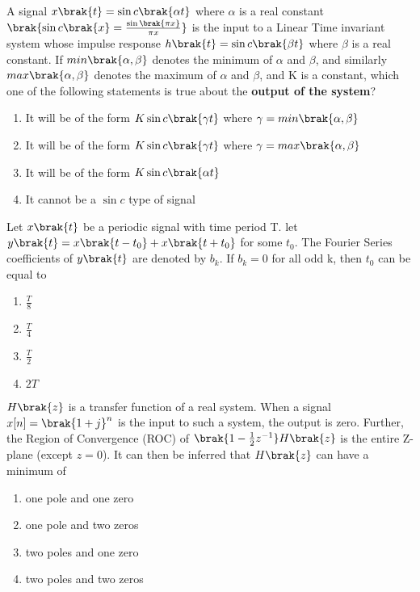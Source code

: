       \item A signal $x\brak{t}=\sin c\brak{\alpha t}$ where $\alpha$ is a real constant $\brak{\sin c\brak{x}=\frac{\sin\brak{\pi x}}{\pi x}}$ is the input to a Linear Time invariant system whose impulse response $h\brak{t}=\sin c\brak{\beta t}$ where $\beta$ is a real constant. If $min\brak{\alpha,\beta}$ denotes the minimum of $\alpha$ and $\beta$, and similarly $max\brak{\alpha,\beta}$ denotes the maximum of $\alpha$ and $\beta$, and K is a constant, which one of the following statements is true about the \textbf{output of the system}?
      \begin{enumerate}
          \item It will be of the form $K\sin c\brak{\gamma t}$ where $\gamma=min\brak{\alpha,\beta}$
           \item It will be of the form $K\sin c\brak{\gamma t}$ where $\gamma=max\brak{\alpha,\beta}$
           \item It will be of the form $K \sin c\brak{\alpha t}$
           \item It cannot be a $\sin c$ type of signal
      \end{enumerate}
      \item Let $x\brak{t}$ be  a periodic signal with time period T. let $y\brak{t}=x\brak{t-t_0}+x\brak{t+t_0}$ for some $t_0$. The Fourier Series coefficients of $y\brak{t}$ are denoted by $b_k$. If $b_k=0$ for all odd k, then $t_0$ can be equal to 
      \begin{enumerate}
          \item $\frac{T}{8}$
          \item $\frac{T}{4}$
          \item $\frac{T}{2}$
          \item $2T$
      \end{enumerate}
      \item $H\brak{z}$ is a transfer function of a real system. When a signal $x[n]=\brak{1+j}^n$ is the input to such a system, the output is zero. Further, the Region of Convergence (ROC) of $\brak{1-\frac{1}{2}z^{-1}}H\brak{z}$ is the entire Z-plane (except $z=0$). It can then be inferred that $H\brak{z}$ can have a minimum of
      \begin{enumerate}
          \item one pole and one zero
          \item one pole and two zeros
          \item two poles and one zero
          \item two poles and two zeros
      \end{enumerate}
